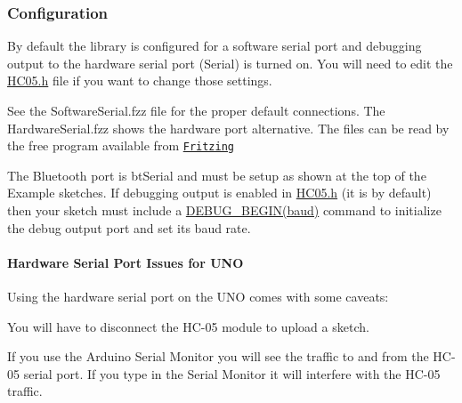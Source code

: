 \subsubsection*{Configuration}

By default the library is configured for a software serial port and debugging output to the hardware serial port (Serial) is turned on. You will need to edit the \hyperlink{_h_c05_8h}{H\+C05.\+h} file if you want to change those settings.

See the {\ttfamily Software\+Serial.\+fzz} file for the proper default connections. The {\ttfamily Hardware\+Serial.\+fzz} shows the hardware port alternative. The files can be read by the free program available from \href{http://fritzing.org/home/}{\tt Fritzing}

The Bluetooth port is {\ttfamily bt\+Serial} and must be setup as shown at the top of the Example sketches. If debugging output is enabled in \hyperlink{_h_c05_8h}{H\+C05.\+h} (it is by default) then your sketch must include a \hyperlink{_h_c05_8h_aa13ce4e79fa7e62c8716cc31e158e5a6}{D\+E\+B\+U\+G\+\_\+\+B\+E\+G\+I\+N(baud)} command to initialize the debug output port and set it\textquotesingle{}s baud rate.

\paragraph*{Hardware Serial Port Issues for U\+NO}

Using the hardware serial port on the U\+NO comes with some caveats\+:


\begin{DoxyItemize}
\item You will have to disconnect the H\+C-\/05 module to upload a sketch.
\item If you use the Arduino {\ttfamily Serial Monitor} you will see the traffic to and from the H\+C-\/05 serial port. If you type in the {\ttfamily Serial Monitor} it will interfere with the H\+C-\/05 traffic. 
\end{DoxyItemize}